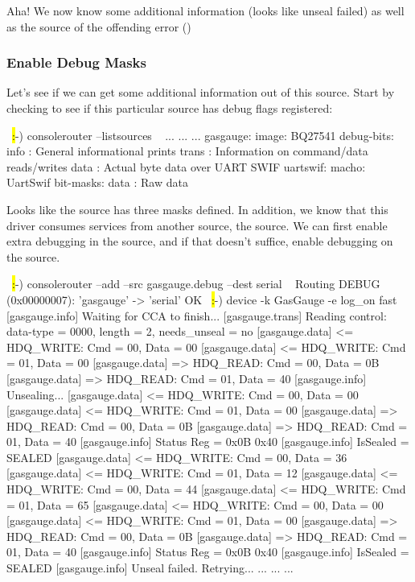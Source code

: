Aha! We now know some additional information (looks like unseal failed) as well as the source of the offending error
()

\subsubsection{Enable Debug Masks}

Let's see if we can get some additional information out of this source. Start by checking to see if this particular source 
has debug flags registered:

\begin{LuaCode}
~\hl:-) consolerouter --listsources ~
...
...
...
gasgauge:
	image: BQ27541
	debug-bits:
		info : General informational prints
		trans : Information on command/data reads/writes
		data : Actual byte data over UART SWIF
uartswif:
	macho: UartSwif
	bit-masks:
		data : Raw data
\end{LuaCode}

Looks like the  source has three masks defined. In addition, we know that this driver consumes services from another source, 
the  source. We can first enable extra debugging in the  source, and if that doesn't suffice, enable 
debugging on the  source. 

\begin{LuaCode}
~\hl:-) consolerouter --add --src gasgauge.debug --dest serial ~
Routing DEBUG (0x00000007): 'gasgauge' -> 'serial'
OK
~\hl:-) device -k GasGauge -e log\_on fast ~
[gasgauge.info] Waiting for CCA to finish...
[gasgauge.trans] Reading control: data-type = 0000, length = 2, needs_unseal = no
[gasgauge.data] <= HDQ_WRITE: Cmd = 00, Data = 00
[gasgauge.data] <= HDQ_WRITE: Cmd = 01, Data = 00
[gasgauge.data] => HDQ_READ: Cmd = 00, Data = 0B
[gasgauge.data] => HDQ_READ: Cmd = 01, Data = 40
[gasgauge.info] Unsealing...
[gasgauge.data] <= HDQ_WRITE: Cmd = 00, Data = 00
[gasgauge.data] <= HDQ_WRITE: Cmd = 01, Data = 00
[gasgauge.data] => HDQ_READ: Cmd = 00, Data = 0B
[gasgauge.data] => HDQ_READ: Cmd = 01, Data = 40
[gasgauge.info] Status Reg = 0x0B 0x40
[gasgauge.info] IsSealed = SEALED
[gasgauge.data] <= HDQ_WRITE: Cmd = 00, Data = 36
[gasgauge.data] <= HDQ_WRITE: Cmd = 01, Data = 12
[gasgauge.data] <= HDQ_WRITE: Cmd = 00, Data = 44
[gasgauge.data] <= HDQ_WRITE: Cmd = 01, Data = 65
[gasgauge.data] <= HDQ_WRITE: Cmd = 00, Data = 00
[gasgauge.data] <= HDQ_WRITE: Cmd = 01, Data = 00
[gasgauge.data] => HDQ_READ: Cmd = 00, Data = 0B
[gasgauge.data] => HDQ_READ: Cmd = 01, Data = 40
[gasgauge.info] Status Reg = 0x0B 0x40
[gasgauge.info] IsSealed = SEALED
[gasgauge.info] Unseal failed. Retrying...
...
...
...
\end{LuaCode}


